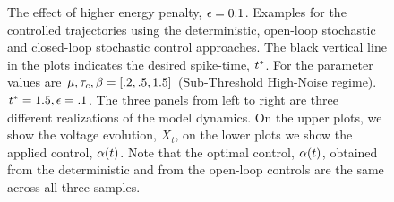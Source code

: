 \documentclass[12pt]{iopart}
\begin{document}
\begin{figure}[h]
\begin{center}
\caption[]{The effect of higher energy penalty, ${\epsilon} = 0.1$.
Examples for the controlled trajectories using the deterministic,
open-loop stochastic and closed-loop stochastic control approaches. The black vertical line in the plots indicates the desired
spike-time, ${ t^* }$. For the parameter values are ${\mu }, { \tau_{c} }, {\beta} = [.2, .5,  1.5]$ (Sub-Threshold
High-Noise regime). ${ t^* } = 1.5, {\epsilon} = .1$. The three panels from left to
right are three different realizations of the model dynamics. On the upper
plots, we show the voltage evolution, $X_t$, on the lower plots we show the
applied control, ${\alpha}(t)$. Note that the optimal control, ${\alpha}(t)$, obtained from
the deterministic and from the open-loop controls are the same across all three
samples.}
\label{fig:control_trajectories_examples_high_epsilon}
\end{center}
\end{figure}
\end{document}
